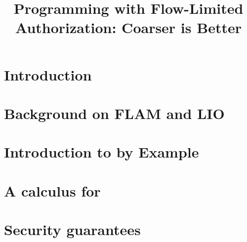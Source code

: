 \documentclass[conference,a4paper,10pt,times]{IEEEtran}
\begin{document}
\title{Programming with Flow-Limited Authorization: Coarser is Better}

\ifx\review\undefined
\author{
\and
{}
}
\else
\fi

\maketitle




\section{Introduction}\label{sec:introduction}


\section{Background on FLAM and LIO}\label{sec:background}



\section{Introduction to \lang{} by Example}\label{sec:programming}



\section{A calculus for \lang}\label{sec:calculus}



\section{Security guarantees}\label{sec:guarantees}
\end{document}
